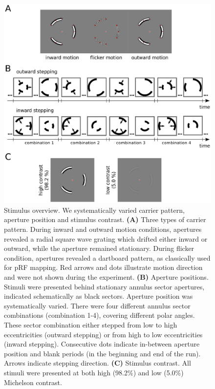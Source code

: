 \begin{figure}[htbp!]
\centering
\includegraphics[width=\textwidth]{figures/chapter_04/fig1.eps}
\caption{Stimulus overview. We systematically varied carrier pattern, aperture position and stimulus contrast. \textbf{(A)} Three types of carrier pattern. During inward and outward motion conditions, apertures revealed a radial square wave grating which drifted either inward or outward, while the aperture remained stationary. During flicker condition, apertures revealed a dartboard pattern, as classically used for pRF mapping. Red arrows and dots illustrate motion direction and were not shown during the experiment. \textbf{(B)} Aperture positions. Stimuli were presented behind stationary annulus sector apertures, indicated schematically as black sectors. Aperture position was systematically varied. There were four different annulus sector combinations (combination 1-4), covering different polar angles. These sector combination either stepped from low to high eccentricities (outward stepping) or from high to low eccentricities (inward stepping). Consecutive dots indicate in-between aperture position and blank periods (in the beginning and end of the run). Arrows indicate stepping direction. \textbf{(C)} Stimulus contrast. All stimuli were presented at both high (98.2\%) and low (5.0\%) Michelson contrast.}
\label{fig:expOv}
\end{figure}

